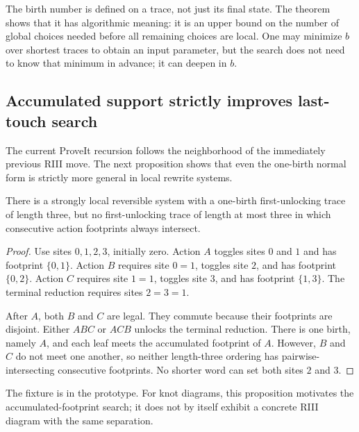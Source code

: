 \begin{remark}
The birth number is defined on a trace, not just its final state.  The theorem
shows that it has algorithmic meaning: it is an upper bound on the number of
global choices needed before all remaining choices are local.  One may minimize
$b$ over shortest traces to obtain an input parameter, but the search does not
need to know that minimum in advance; it can deepen in $b$.
\end{remark}

\subsection{Accumulated support strictly improves last-touch search}

The current ProveIt recursion follows the neighborhood of the immediately
previous RIII move.  The next proposition shows that even the one-birth normal
form is strictly more general in local rewrite systems.

\begin{proposition}
\label{prop:last-vs-accumulated}
There is a strongly local reversible system with a one-birth first-unlocking
trace of length three, but no first-unlocking trace of length at most three in
which consecutive action footprints always intersect.
\end{proposition}

\begin{proof}
Use sites $0,1,2,3$, initially zero.  Action $A$ toggles sites $0$ and $1$ and
has footprint $\{0,1\}$.  Action $B$ requires site $0=1$, toggles site $2$, and
has footprint $\{0,2\}$.  Action $C$ requires site $1=1$, toggles site $3$, and
has footprint $\{1,3\}$.  The terminal reduction requires sites $2=3=1$.

After $A$, both $B$ and $C$ are legal.  They commute because their footprints
are disjoint.  Either $ABC$ or $ACB$ unlocks the terminal reduction.  There is
one birth, namely $A$, and each leaf meets the accumulated footprint of $A$.
However, $B$ and $C$ do not meet one another, so neither length-three ordering
has pairwise-intersecting consecutive footprints.  No shorter word can set both
sites $2$ and $3$.
\end{proof}

The fixture is  in the prototype.  For knot
diagrams, this proposition motivates the accumulated-footprint search; it does
not by itself exhibit a concrete RIII diagram with the same separation.
